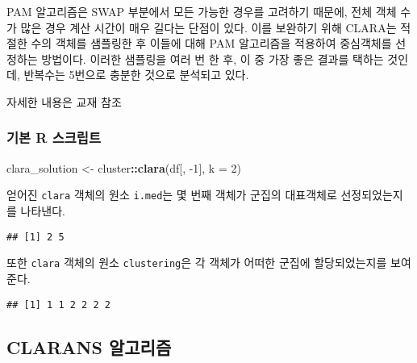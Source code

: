 \documentclass[]{book}
\newenvironment{Shaded}{\begin{snugshade}}{\end{snugshade}}
\newcommand{\DataTypeTok}[1]{\textcolor[rgb]{0.13,0.29,0.53}{#1}}
\newcommand{\DecValTok}[1]{\textcolor[rgb]{0.00,0.00,0.81}{#1}}
\newcommand{\KeywordTok}[1]{\textcolor[rgb]{0.13,0.29,0.53}{\textbf{#1}}}
\newcommand{\NormalTok}[1]{#1}
\newcommand{\OperatorTok}[1]{\textcolor[rgb]{0.81,0.36,0.00}{\textbf{#1}}}
\newcommand{\StringTok}[1]{\textcolor[rgb]{0.31,0.60,0.02}{#1}}
\begin{document}
PAM 알고리즘은 SWAP 부분에서 모든 가능한 경우를 고려하기 때문에, 전체 객체 수가 많은 경우 계산 시간이 매우 길다는 단점이 있다. 이를 보완하기 위해 CLARA는 적절한 수의 객체를 샘플링한 후 이들에 대해 PAM 알고리즘을 적용하여 중심객체를 선정하는 방법이다. 이러한 샘플링을 여러 번 한 후, 이 중 가장 좋은 결과를 택하는 것인데, 반복수는 5번으로 충분한 것으로 분석되고 있다.

자세한 내용은 교재 \citep{jun2012datamining} 참조

\hypertarget{clara-basic-script}{%
\subsubsection{기본 R 스크립트}\label{clara-basic-script}}

\begin{Shaded}
\begin{Highlighting}[]
\NormalTok{clara_solution <-}\StringTok{ }\NormalTok{cluster}\OperatorTok{::}\KeywordTok{clara}\NormalTok{(df[, }\DecValTok{-1}\NormalTok{], }\DataTypeTok{k =} \DecValTok{2}\NormalTok{)}
\end{Highlighting}
\end{Shaded}

얻어진 \texttt{clara} 객체의 원소 \texttt{i.med}는 몇 번째 객체가 군집의 대표객체로 선정되었는지를 나타낸다.

\begin{Shaded}
\end{Shaded}

\begin{verbatim}
## [1] 2 5
\end{verbatim}

또한 \texttt{clara} 객체의 원소 \texttt{clustering}은 각 객체가 어떠한 군집에 할당되었는지를 보여준다.

\begin{Shaded}
\end{Shaded}

\begin{verbatim}
## [1] 1 1 2 2 2 2
\end{verbatim}

\hypertarget{clarans}{%
\subsection{CLARANS 알고리즘}\label{clarans}}
\end{document}
